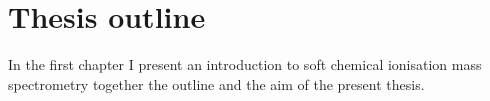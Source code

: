 




























\section{Thesis outline}
In the first chapter I present an introduction to soft chemical ionisation mass spectrometry together the outline  and the aim of the present thesis.

